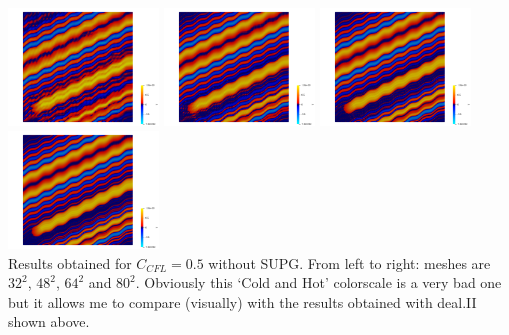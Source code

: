 \begin{center}
\includegraphics[width=4cm]{python_codes/fieldstone_43/results/experiment9/T32.png}
\includegraphics[width=4cm]{python_codes/fieldstone_43/results/experiment9/T48.png}
\includegraphics[width=4cm]{python_codes/fieldstone_43/results/experiment9/T64.png}
\includegraphics[width=4cm]{python_codes/fieldstone_43/results/experiment9/T80.png}\\
{\captionfont Results obtained for $C_{CFL}=0.5$ without SUPG. From left to right: 
meshes are $32^2$, $48^2$, $64^2$ and $80^2$. Obviously this `Cold and Hot' colorscale
is a very bad one but it allows me to compare (visually) with the results obtained with
deal.II shown above.}
\end{center}





